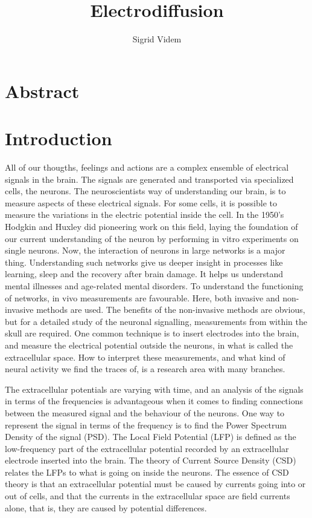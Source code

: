 \documentclass{article}
\author{Sigrid Videm}
\title{Electrodiffusion}
\begin{document}
\maketitle


\section{Abstract} 
\tableofcontents %


\section{Introduction}
All of our thougths, feelings and actions are a complex ensemble of electrical signals in the brain. The signals are generated and transported via specialized cells, the neurons. The neuroscientists way of understanding our brain, is to measure aspects of these electrical signals. For some cells, it is possible to measure the variations in the electric potential inside the cell. In the 1950's Hodgkin and Huxley did pioneering work on this field, laying the foundation of our current understanding of the neuron by performing in vitro experiments on single neurons. Now, the interaction of neurons in large networks is a major thing. Understanding such networks give us deeper insight in processes like learning, sleep and the recovery after brain damage. It helps us understand mental illnesses and age-related mental disorders. To understand the functioning of networks, in vivo measurements are favourable. Here, both invasive and non-invasive methods are used. The benefits of the non-invasive methods are obvious, but for a detailed study of the neuronal signalling, measurements from within the skull are required.  One common technique is to insert electrodes into the brain, and measure the electrical potential outside the neurons, in what is called the extracellular space. How to interpret these measurements, and what kind of neural activity we find the traces of, is a research area with many branches. 

The extracellular potentials are varying with time, and an analysis of the signals in terms of the frequencies is advantageous when it comes to finding connections between the measured signal and the behaviour of the neurons. One way to represent the signal in terms of the frequency is to find the Power Spectrum Density of the signal (PSD).  The Local Field Potential (LFP) is defined as the low-frequency part of the extracellular potential recorded by an extracellular electrode inserted into the brain. The theory of Current Source Density (CSD) relates the LFPs to what is going on inside the neurons. The essence of CSD theory is that an extracellular potential must be caused by currents going into or out of cells, and that the currents in the extracellular space are field currents alone, that is, they are caused by potential differences. 
\end{document}
